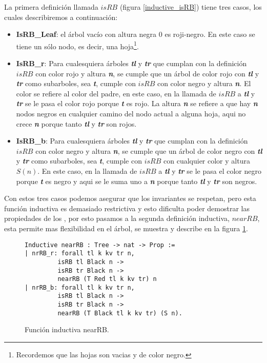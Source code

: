 La primera definici\'on llamada $isRB$ (figura \ref{inductive_isRB}) tiene tres casos, los
cuales describiremos a continuaci\'on:
\begin{itemize}
        \item \textbf{IsRB\_Leaf}: el árbol vacío con altura negra 0 es roji-negro. En este caso
        se tiene un s\'olo nodo, es decir, una hoja\footnote{Recordemos que las hojas son vacias y de
        color negro.}.
        \item \textbf{IsRB\_r}: Para cualesquiera \'arboles \textbf{\textit{tl}} y \textbf{\textit{tr}} que cumplan con la
        definici\'on $isRB$ con color rojo y altura \textbf{\textit{n}}, se cumple que un \'arbol de color rojo con
        \textbf{\textit{tl}} y \textbf{\textit{tr}} como subarboles, sea \textbf{\textit{t}}, cumple con $isRB$ con color negro y altura \textbf{\textit{n}}. El
        color se refiere al color del padre, en este caso, en la llamada de $isRB$ a \textbf{\textit{tl}} y \textbf{\textit{tr}} se
        le pasa el color rojo porque \textbf{\textit{t}} es rojo. La altura \textbf{\textit{n}} se refiere a que hay \textbf{\textit{n}} nodos
        negros en cualquier camino del nodo actual a alguna hoja, aqui no crece \textbf{\textit{n}} porque tanto
        \textbf{\textit{tl}} y \textbf{\textit{tr}} son rojos.
        \item \textbf{IsRB\_b}: Para cualesquiera \'arboles \textbf{\textit{tl}} y \textbf{\textit{tr}} que cumplan con la
        definici\'on $isRB$ con color negro y altura \textbf{\textit{n}}, se cumple que un \'arbol de color negro
        con \textbf{\textit{tl}} y \textbf{\textit{tr}} como subarboles, sea \textbf{\textit{t}}, cumple con $isRB$ con cualquier color y altura
        $S(n)$. En este caso, en la llamada de $isRB$ a \textbf{\textit{tl}} y \textbf{\textit{tr}} se le pasa el color negro
        porque \textbf{\textit{t}} es negro y aqui se le suma uno a \textbf{\textit{n}} porque tanto \textbf{\textit{tl}} y \textbf{\textit{tr}} son negros.
\end{itemize}

Con estos tres casos podemos asegurar que los invariantes se respetan, pero esta funci\'on
inductiva es demasiado restrictiva y esto dificulta poder demostrar las propiedades de los {\arns},
por esto pasamos a la segunda definici\'on inductiva, $nearRB$, esta permite mas flexibilidad en el
\'arbol, se muestra y describe en la figura \ref{inductive_nearRB}.
\begin{figure}[!ht]
\centering
\captionsetup{justification=centering}
\begin{verbatim}
Inductive nearRB : Tree -> nat -> Prop :=
| nrRB_r: forall tl k kv tr n,
         isRB tl Black n ->
         isRB tr Black n ->
         nearRB (T Red tl k kv tr) n
| nrRB_b: forall tl k kv tr n,
         isRB tl Black n ->
         isRB tr Black n ->
         nearRB (T Black tl k kv tr) (S n).
\end{verbatim}
\caption{Funci\'on inductiva nearRB.}
\label{inductive_nearRB}
\end{figure}

